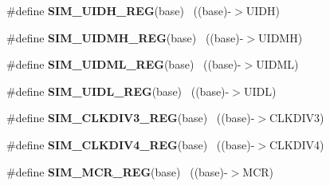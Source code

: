 \begin{DoxyCompactItemize}
\item 
\hypertarget{group___s_i_m___register___accessor___macros_ga2c1fe45ab77b346f67b2f3bb2f59519a}{}\#define {\bfseries S\+I\+M\+\_\+\+U\+I\+D\+H\+\_\+\+R\+E\+G}(base)                                          ~((base)-\/$>$U\+I\+D\+H)\label{group___s_i_m___register___accessor___macros_ga2c1fe45ab77b346f67b2f3bb2f59519a}

\item 
\hypertarget{group___s_i_m___register___accessor___macros_gaffd69cc3f48c0e204d8c659424b4c51d}{}\#define {\bfseries S\+I\+M\+\_\+\+U\+I\+D\+M\+H\+\_\+\+R\+E\+G}(base)                                        ~((base)-\/$>$U\+I\+D\+M\+H)\label{group___s_i_m___register___accessor___macros_gaffd69cc3f48c0e204d8c659424b4c51d}

\item 
\hypertarget{group___s_i_m___register___accessor___macros_gaac80320f7e56ccd1cd6b54cfdc322430}{}\#define {\bfseries S\+I\+M\+\_\+\+U\+I\+D\+M\+L\+\_\+\+R\+E\+G}(base)                                        ~((base)-\/$>$U\+I\+D\+M\+L)\label{group___s_i_m___register___accessor___macros_gaac80320f7e56ccd1cd6b54cfdc322430}

\item 
\hypertarget{group___s_i_m___register___accessor___macros_ga50225b2615456e0a763efbe4ec59b077}{}\#define {\bfseries S\+I\+M\+\_\+\+U\+I\+D\+L\+\_\+\+R\+E\+G}(base)                                          ~((base)-\/$>$U\+I\+D\+L)\label{group___s_i_m___register___accessor___macros_ga50225b2615456e0a763efbe4ec59b077}

\item 
\hypertarget{group___s_i_m___register___accessor___macros_ga8144b079df4744cd9e4fd9d191b011fd}{}\#define {\bfseries S\+I\+M\+\_\+\+C\+L\+K\+D\+I\+V3\+\_\+\+R\+E\+G}(base)                                    ~((base)-\/$>$C\+L\+K\+D\+I\+V3)\label{group___s_i_m___register___accessor___macros_ga8144b079df4744cd9e4fd9d191b011fd}

\item 
\hypertarget{group___s_i_m___register___accessor___macros_ga795a8114ce70db30396e9b8eec41e0ba}{}\#define {\bfseries S\+I\+M\+\_\+\+C\+L\+K\+D\+I\+V4\+\_\+\+R\+E\+G}(base)                                    ~((base)-\/$>$C\+L\+K\+D\+I\+V4)\label{group___s_i_m___register___accessor___macros_ga795a8114ce70db30396e9b8eec41e0ba}

\item 
\hypertarget{group___s_i_m___register___accessor___macros_ga5f8365f90745a3a961c525df5496d9f7}{}\#define {\bfseries S\+I\+M\+\_\+\+M\+C\+R\+\_\+\+R\+E\+G}(base)                                            ~((base)-\/$>$M\+C\+R)\label{group___s_i_m___register___accessor___macros_ga5f8365f90745a3a961c525df5496d9f7}


\end{DoxyCompactItemize}
